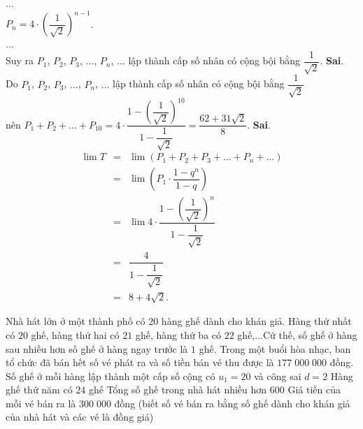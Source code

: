 \begin{ex}
{\begin{itemchoice}
		$\ldots$\\
		$P_n=4\cdot \left(\dfrac{1}{\sqrt{2}}\right)^{n-1}$.\\
		$\ldots$\\
		Suy ra 	$P_1$, $P_2$, $P_3$, $\ldots$, $P_n$, $\ldots$ lập thành cấp số nhân có cộng bội bằng $\dfrac{1}{\sqrt{2}}$.
			\itemch \textbf{Sai}.\\
			Do $P_1$, $P_2$, $P_3$, $\ldots$, $P_n$, $\ldots$ lập thành cấp số nhân có cộng bội bằng $\dfrac{1}{\sqrt{2}}$ \\
			nên $P_1+P_2+\ldots+P_{10}=4\cdot\dfrac{1-\left(\dfrac{1}{\sqrt{2}}\right)^{10}}{1-\dfrac{1}{\sqrt{2}}}=\dfrac{62+31\sqrt{2}}{8}$.
			\itemch
			\textbf{Sai}.\\
		\begin{eqnarray*}
		\displaystyle \lim T 
		 &=&\displaystyle \lim (P_1+P_2+P_3+\ldots+P_n+\ldots)\\
		 &=&\displaystyle \lim \left(P_1\cdot \dfrac{1-q^n}{1-q}\right)\\
		 &=&\displaystyle \lim 4\cdot \dfrac{1-\left(\dfrac{1}{\sqrt{2}}\right)^n}{1-\dfrac{1}{\sqrt{2}}}\\
		 &=& \dfrac{4}{1-\dfrac{1}{\sqrt{2}}}\\
		 &=&8+4\sqrt{2}.
		\end{eqnarray*}
		\end{itemchoice}
	}
\end{ex}

\begin{ex}%
Nhà hát lớn ở một thành phố có $20$ hàng ghế dành cho khán giả. Hàng thứ nhất có $20$ ghế, hàng thứ hai có $21$ ghế, hàng thứ ba có $22$ ghế,...Cứ thế, số ghế ở hàng sau nhiều hơn số ghế ở hàng ngay trước là $1$ ghế. Trong một buổi hòa nhạc, ban tổ chức đã bán hết số vé phát ra và số tiền bán vé thu được là $177\;000\;000$ đồng.
	\choiceTF
	{Số ghế ở mỗi hàng lập thành một cấp số cộng có $u_1=20$ và công sai $d=2$}
	{\True Hàng ghế thứ năm có $24$ ghế}
	{Tổng số ghế trong nhà hát nhiều hơn $600$}
	{\True Giá tiền của mỗi vé bán ra là $300\;000$ đồng (biết số vé bán ra bằng số ghế dành cho khán giả của nhà hát và các vé là đồng giá)}
\end{ex}

